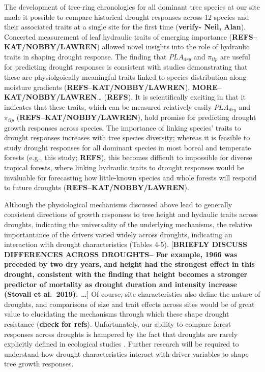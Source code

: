 \documentclass[]{article}
\begin{document}
The development of tree-ring chronologies for all dominant tree species
at our site \citep{helcoski_growing_2019} made it possible to compare
historical drought responses across 12 species and their associated
traits at a single site for the first time (\textbf{verify- Neil,
Alan}). Concerted measurement of leaf hydraulic traits of emerging
importance (\textbf{REFS--KAT/NOBBY/LAWREN}) allowed novel insights into
the role of hydraulic traits in shaping drought response. The finding
that \(PLA_{dry}\) and \(\pi_{tlp}\) are useful for predicting drought
responses is consistent with studies demonstrating that these are
physiolgoically meaningful traits linked to species distribution along
moisture gradients (\textbf{REFS--KAT/NOBBY/LAWREN}),
\textbf{MORE--KAT/NOBBY/LAWREN}\ldots{} (\textbf{REFS}). It is
scientifically exciting in that it indicates that these traits, which
can be measured relatively easily \(PLA_{dry}\) and \(\pi_{tlp}\)
(\textbf{REFS--KAT/NOBBY/LAWREN}), hold promise for predicting drought
growth responses across species. The importance of linking species'
traits to drought responses increases with tree species diversity;
whereas it is feasible to study drought responses for all dominant
species in most boreal and temperate forests (e.g., this study;
\textbf{REFS}), this becomes difficult to impossible for diverse
tropical forests, where linking hydraulic traits to drought responses
would be invaluable for forecasting how little-known species and whole
forests will respond to future droughts
(\textbf{REFS--KAT/NOBBY/LAWREN}).

Although the physiological mechanisms discussed above lead to generally
consistent directions of growth responses to tree height and hydaulic
traits across droughts, indicating the universality of the underlying
mechanisms, the relative importantance of the drivers varied widely
across droughts, indicating an interaction with drought characteristics
(Tables 4-5). {[}\textbf{BRIEFLY DISCUSS DIFFERENCES ACROSS DROUGHTS--
For example, 1966 was preceded by two dry years, and height had the
strongest effect in this drought, consistent with the finding that
height becomes a stronger predictor of mortality as drought duration and
intensity increase (Stovall et al.~2019). \ldots{}}{]} Of course, site
characteristics also define the nature of droughts, and comparisons of
size and trait effects across sites would be of great value to
elucidating the mechanisms through which these shape drought resistance
(\textbf{check for refs}). Unfortunately, our ability to compare forest
responses across droughts is hampered by the fact that droughts are
rarely explicitly defined in ecological studies \citep{slette_how_2019}.
Further research will be required to understand how drought
characteristics interact with driver variables to shape tree growth
responses.
\end{document}

